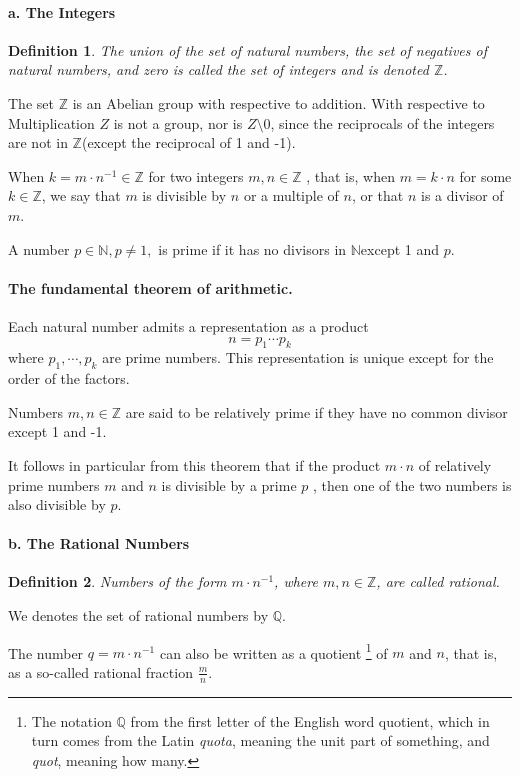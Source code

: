 \documentclass[a4paper,12pt]{article} %
\newtheorem{definition}{Definition}[section]
\begin{document}
\paragraph{a. The Integers}
\begin{definition}
    The union of the set of natural numbers, the set of negatives of 
    natural numbers, and zero is called the set of \textit{integers}
    and is denoted $\mathbb{Z}$.
\end{definition}

The set $\mathbb{Z}$  is an Abelian group with respective to addition.
With respective to Multiplication $Z$ is not a group, nor is $Z\setminus 0$, 
since the reciprocals of the integers are not in $\mathbb{Z} $(except 
the reciprocal of 1 and -1).

When $k=m\cdot n^{-1}\in\mathbb{Z}$ for two integers $m,n\in\mathbb{Z}$ ,
that is, when $m=k\cdot n$ for some $k\in \mathbb{Z} $, we say that 
$m$ is divisible by $n$ or a multiple of $n$, or that $n$ is a divisor 
of $m$.

A number $p\in \mathbb{N},p\ne 1,$ is prime if it has no divisors in 
$\mathbb{N} $except 1 and $p$.

\paragraph{The fundamental theorem of arithmetic.} Each natural number 
admits a representation as a product 
\[n=p_1\cdots p_k\]
where $p_1,\cdots,p_k$ are prime numbers. This representation is unique
except for the order of the factors.

Numbers $m,n\in \mathbb{Z}$ are said to be relatively prime if they 
have no common divisor except 1 and -1.

It follows in particular from this theorem that if the product $m\cdot n$
of relatively prime numbers $m$ and $n$ is divisible by a prime $p$ ,
then one of the two numbers is also divisible by $p$.

\paragraph{b. The Rational Numbers}
\begin{definition}
    Numbers of the form $m\cdot n^{-1}$, where $m,n\in \mathbb{Z}$, are called 
    rational.
\end{definition}

We denotes the set of rational numbers by $\mathbb{Q}$.

The number $q=m\cdot n^{-1}$ can also be written as a quotient 
\footnote{The notation $\mathbb{Q}$ from the first letter of the English 
word quotient, which in turn comes from the Latin \textit{quota}, meaning 
the unit part of something, and \textit{quot}, meaning how many.} 
of $m$ and $n$, that is, as a so-called rational fraction $\displaystyle \frac{m}{n}.$
\end{document}
